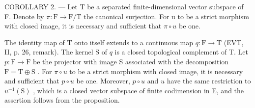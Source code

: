 COROLLARY 2. --- Let T be a separated finite-dimensional vector subspace of F. Denote by \(\pi\colon\mathrm{F}\to\mathrm{F}/\mathrm{T}\) the canonical surjection. For u to be a strict morphism with closed image, it is necessary and sufficient that \(\pi\circ u\) be one.

The identity map of T onto itself extends to a continuous map \(q \colon \mathrm{F} \to \mathrm{T}\) (EVT, II, p. 26, remark). The kernel S of \(q\) is a closed topological complement of T. Let \(p \colon \mathrm{F} \to \mathrm{F}\) be the projector with image S associated with the decomposition \(\mathrm{F} = \mathrm{T} \oplus \mathrm{S}\) . For \(\pi \circ u\) to be a strict morphism with closed image, it is necessary and sufficient that \(p \circ u\) be one. Moreover, \(p \circ u\) and \(u\) have the same restriction to \(u^{-1}(\mathrm{S})\) , which is a closed vector subspace of finite codimension in E, and the assertion follows from the proposition.

